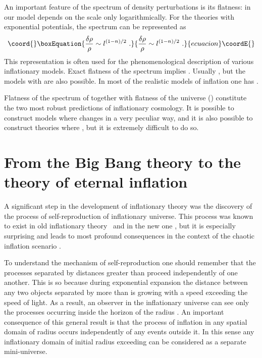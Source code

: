 \documentclass[a4paper,12pt]{article}
\begin{document}
An important feature of the spectrum of density perturbations is its
flatness: \myHighlight{$\frac{\delta \rho}{\rho}$}\coordHE{} in our model depends on the scale
\coordHE{} only logarithmically. For the theories with exponential potentials, the spectrum can be represented as 
\begin{equation}\coord{}\boxEquation{\label{E26a}
\frac{\delta \rho}{\rho} \sim   l^{(1-n)/2}\ .
}{\frac{\delta \rho}{\rho} \sim   l^{(1-n)/2}\ .
}{ecuacion}\coordE{}\end{equation}
This representation is often used for the phenomenological description of various inflationary models. Exact flatness of the spectrum implies \coordHE{}.  Usually \coordHE{}, but the models with \coordHE{} are also possible. In most of the realistic models of inflation one has \coordHE{}.


Flatness of the spectrum of \myHighlight{$\frac{\delta
\rho}{\rho}$}\coordHE{} together with flatness of the universe (\coordHE{})
constitute the two most robust predictions of inflationary cosmology. It
is possible to construct models where \myHighlight{$\frac{\delta \rho}{\rho}$}\coordHE{} changes
in a very peculiar way, and it is also possible to construct theories
where \coordHE{}, but it is extremely difficult to do so.


 

\section{From the Big Bang theory to the theory of eternal inflation}

A significant step in the development of inflationary theory was the discovery of the process of
self-reproduction of inflationary universe. This process was known to
exist in old inflationary theory~\cite{Guth} and in the new one
\cite{Et1,Et2,Et3}, but it is especially surprising and leads to most profound
consequences in the context of the chaotic inflation scenario
\cite{Eternal}. 


To understand the mechanism of self-reproduction one should remember that
the processes separated by distances \coordHE{} greater than \coordHE{} proceed
independently of one another. This is so because during exponential
expansion the distance between any two objects separated by more than
\coordHE{} is growing with a speed exceeding the speed of light. As a
result, an observer in the inflationary universe can see only the
processes occurring inside the horizon of the radius  \coordHE{}.
An important consequence of this general result is that the process of
inflation in any spatial domain of radius \coordHE{} occurs independently
of any events outside it. In this sense any inflationary domain of
initial radius exceeding \coordHE{} can be considered as a separate
mini-universe.
\end{document}
